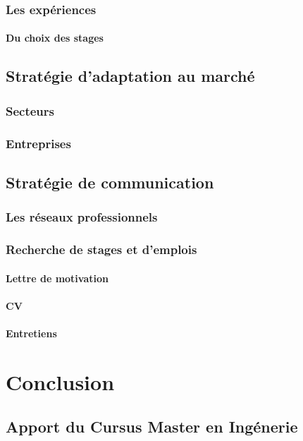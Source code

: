 \documentclass[a4paper,12pt, draft]{report}
\begin{document}
\section{Les expériences}
\subsection{Du choix des stages}

\chapter{Stratégie d'adaptation au marché}
\section{Secteurs}
\section{Entreprises}

\chapter{Stratégie de communication}
\section{Les réseaux professionnels}
\section{Recherche de stages et d'emplois}
\subsection{Lettre de motivation}
\subsection{CV}
\subsection{Entretiens}

\part{Conclusion}
\chapter{Apport du Cursus Master en Ingénerie}
\end{document}
